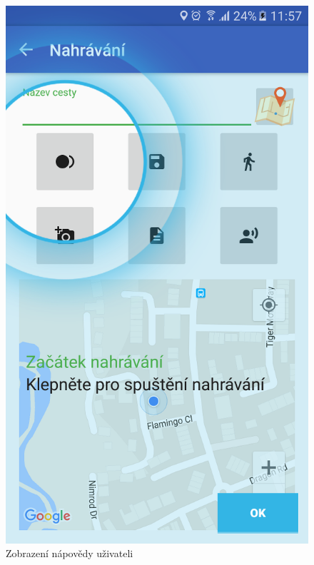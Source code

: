 \documentclass[czech,master,public,dept460,male,java,cpdeclaration]{diploma}
\begin{document}
  \begin{figure}[H]
            \centering
                    \includegraphics[scale=0.14]{img/screen/nahravaninapoveda.png}
            \caption{Zobrazení nápovědy uživateli}
            \label{fig:nahravaninapoveda}
    \end{figure}
\end{document}
